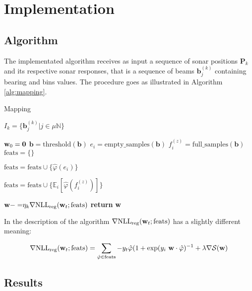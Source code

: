 \section{Implementation}
\subsection{Algorithm}

The implementated algorithm receives as input a sequence of sonar positions
$\mathbf{P}_k$ and its respective sonar responses, that is a sequence of beams
$\mathbf{b}_j^{(k)}$ containing bearing and bins values. The procedure goes
as illustrated in Algorithm \ref{alg:mapping}.


\begin{algorithm}
\caption{Mapping}
\label{alg:mapping}
\begin{algorithmic}

\State $I_k = \{\mathbf{b}_j^{(k)}|j\in \mu\mathbb{N}\}$

\State $\mathrm{\mathbf{w}}_0 = \mathbf{0}$
\State $\mathbf{b} = \mathrm{threshold}(\mathbf{b})$
\State $e_i = \mathrm{empty\_samples}(\mathbf{b})$
\State $f_i^{(z)} = \mathrm{full\_samples}(\mathbf{b})$
\State $\text{feats}=\{\}$

\State $\text{feats}=\text{feats}\cup\{\hat\varphi(e_i)\}$
\EndFor

\State
$\text{feats}=\text{feats}\cup\{\mathbb{E}_i[{
\hat\varphi(f_i^{(z)})}]\}$
\EndFor
\EndFor

\State $\mathrm{\mathbf{w}} {-=}
\eta_k\nabla\text{NLL}_{\text{reg}}(\mathrm{\mathbf{w}}_t;\text{feats})$ 
\EndFor
\State \textbf{return} $\mathrm{\mathbf{w}}$
\EndProcedure
\end{algorithmic}
\end{algorithm}

In the description of the algorithm
$\nabla\text{NLL}_{\text{reg}}(\mathrm{\mathbf{w}}_t;\text{feats})$ has a slightly
different meaning:

\begin{equation*}
\nabla\text{NLL}_{\text{reg}}(\mathrm{\mathbf{w}}_t;\text{feats}) =
\sum_{\hat{\mathbf{\varphi}}\in \text{feats}}
-y_t\hat{\mathbf{\varphi}}(1+\exp(y_i~ \mathrm{\mathbf{w}}\cdot\hat{\mathbf{\varphi}})^{-1} +\lambda\nabla\mathcal{S}(\mathrm{\mathbf{w}})
\end{equation*}


\subsection{Results}
